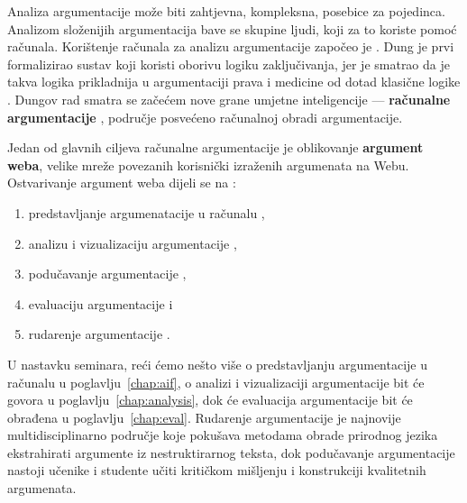 Analiza argumentacije može biti zahtjevna, kompleksna, posebice
za pojedinca. Analizom složenijih argumentacija bave se skupine ljudi,
koji za to koriste pomoć računala. 
Korištenje računala za analizu argumentacije započeo je 
\cite{dung1995acceptability}. Dung je prvi formalizirao sustav koji 
koristi oborivu  logiku zaključivanja, jer je smatrao da 
je takva logika prikladnija u argumentaciji prava i medicine
od dotad klasične logike . 
Dungov rad smatra se začećem nove grane umjetne inteligencije ---
\textbf{računalne argumentacije} , područje 
posvećeno računalnoj obradi argumentacije. 

Jedan od glavnih ciljeva računalne argumentacije je oblikovanje 
\textbf{argument weba}, velike mreže povezanih 
korisnički izraženih argumenata na Webu. Ostvarivanje argument weba 
dijeli se na \citep{Chris2017-REETAW}:
\begin{enumerate}
    \item predstavljanje argumenatacije u računalu ,
    \item analizu i vizualizaciju argumentacije ,
    \item podučavanje argumentacije ,
    \item evaluaciju argumentacije  i
    \item rudarenje argumentacije . 
\end{enumerate}
U nastavku seminara, reći ćemo nešto više o predstavljanju 
argumentacije u računalu u poglavlju~\ref{chap:aif}, 
o analizi i vizualizaciji argumentacije bit će 
govora u poglavlju~\ref{chap:analysis}, dok će evaluacija argumentacije 
bit će obrađena u poglavlju~\ref{chap:eval}. 
Rudarenje argumentacije je najnovije multidisciplinarno područje 
koje pokušava metodama obrade prirodnog jezika 
ekstrahirati argumente iz nestruktirarnog teksta, dok 
podučavanje argumentacije nastoji učenike i studente učiti kritičkom 
mišljenju i konstrukciji kvalitetnih argumenata. 

